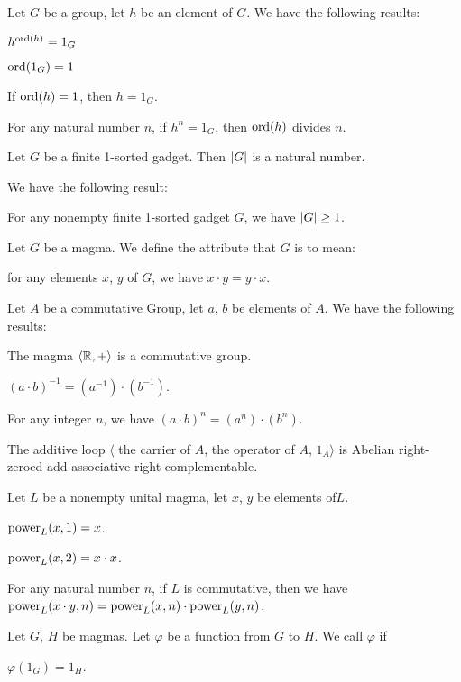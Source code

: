 \documentclass{article}
\begin{document}
Let $G$ be a group, let $h$ be an element of $G$. We have the following
results:
\begin{thm}
\item\label{group1:41} $h^{\operatorname{ord}(h)}=1_{G}$
\item\label{group1:42} $\operatorname{ord}(1_{G})=1$
\item\label{group1:43} If $\operatorname{ord}(h)=1$, then $h=1_{G}$.
\item\label{group1:44} For any natural number $n$, if $h^{n}=1_{G}$,
  then $\operatorname{ord}(h)$ divides $n$.
\end{thm}

\begin{definition}
Let $G$ be a finite 1-sorted gadget. Then $|G|$ is a natural number.
\end{definition}

We have the following result:
\begin{thm}
\item\label{group1:45} For any nonempty finite 1-sorted gadget $G$, we
  have $|G|\geq1$.
\end{thm}

\begin{definition}
Let $G$ be a magma. We define the attribute that $G$ is
 to mean:
\begin{defn}
\item for any elements $x$, $y$ of $G$, we have $x\cdot y=y\cdot x$.
\end{defn}
\end{definition}

Let $A$ be a commutative Group, let $a$, $b$ be elements of $A$. We have
the following results:
\begin{thm}
\item\label{group1:46} The magma $\langle\mathbb{R},+\rangle$ is a commutative group.
\item\label{group1:47} $(a\cdot b)^{-1}=(a^{-1})\cdot(b^{-1})$.
\item\label{group1:48} For any integer $n$, we have $(a\cdot b)^{n}=(a^{n})\cdot(b^{n})$.
\item\label{group1:49} The additive loop $\langle$ the carrier of $A$,
  the operator of $A$, $1_{A}\rangle$ is Abelian right-zeroed
  add-associative right-complementable.
\end{thm}
Let $L$ be a nonempty unital magma, let $x$, $y$ be elements of$L$.
\begin{thm}
\item\label{group1:50} $\operatorname{power}_{L}(x,1)=x$.
\item\label{group1:51} $\operatorname{power}_{L}(x,2)=x\cdot x$.
\item\label{group1:52} For any natural number $n$, if $L$ is
  commutative, then we have
  $\operatorname{power}_{L}(x\cdot y,n)=\operatorname{power}_{L}(x,n)\cdot\operatorname{power}_{L}(y,n)$.
\end{thm}

\begin{definition}
Let $G$, $H$ be magmas. Let $\varphi$ be a function from $G$ to $H$.
We call $\varphi$  if
\begin{defn}
\item\label{group1:def13} $\varphi(1_{G})=1_{H}$.
\end{defn}
\end{definition}
\end{document}

